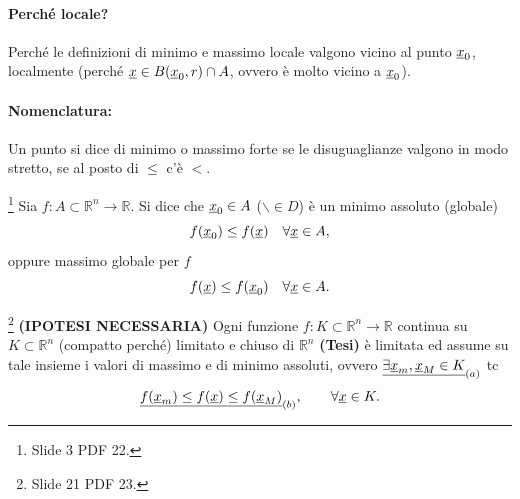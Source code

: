 \paragraph{Perché locale?} Perché le definizioni di minimo e massimo locale valgono vicino al punto $\uline x_0$, localmente (perché $\uline x\in B(\uline x_0,r)\cap A$, ovvero è molto vicino a $\uline x_0$).

\paragraph{Nomenclatura:} Un punto si dice di minimo o massimo forte se le disuguaglianze valgono in modo stretto, se al posto di $\leq$ c'è $<$.

\begin{definition}\footnote{Slide 3 PDF 22.}
	Sia $f:A\subset\mathbb{R}^n\rightarrow\mathbb{R}$. Si dice che $\uline x_0\in A$ ($\backslash\in D$) è un minimo assoluto (globale)
	\begin{equation*}
		f(\uline x_0)\leq f(\uline x)\quad \forall\uline x\in A,
	\end{equation*}
	oppure massimo globale per $f$
	\begin{equation*}
		f(\uline x)\leq f(\uline x_0) \quad \forall\uline x\in  A.
	\end{equation*}
\end{definition}

\begin{theorem}[Weierstrass]\label{th:weierstrass_2}\footnote{Slide 21 PDF 23.}
	\textbf{(IPOTESI NECESSARIA)} Ogni funzione $f:K\subset\mathbb{R}^n\rightarrow\mathbb{R}$ continua su $K\subset\mathbb{R}^n$ (compatto perché) limitato e chiuso di $\mathbb{R}^n$ \textbf{(Tesi)} è limitata ed assume su tale insieme i valori di massimo e di minimo assoluti, ovvero $\underline{\exists\uline x_m,\uline x_M\in K}_{(a)}$ tc 
	\begin{equation*}
		\underline{f(\uline x_m)\leq f(\uline x)\leq f(\uline x_M)}_{(b)},\qquad\forall \uline x\in K.
	\end{equation*}
\end{theorem}

